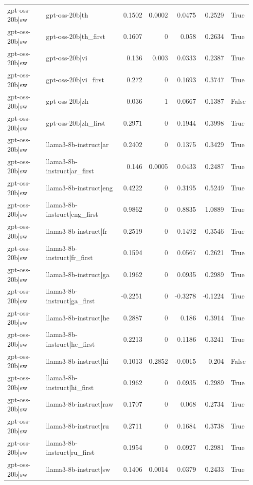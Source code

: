 \begin{table}
\begin{tabular}{l l r r r r l}
gpt-oss-20b|sw & gpt-oss-20b|th & 0.1502 & 0.0002 & 0.0475 & 0.2529 & True \\
gpt-oss-20b|sw & gpt-oss-20b|th_first & 0.1607 & 0 & 0.058 & 0.2634 & True \\
gpt-oss-20b|sw & gpt-oss-20b|vi & 0.136 & 0.003 & 0.0333 & 0.2387 & True \\
gpt-oss-20b|sw & gpt-oss-20b|vi_first & 0.272 & 0 & 0.1693 & 0.3747 & True \\
gpt-oss-20b|sw & gpt-oss-20b|zh & 0.036 & 1 & -0.0667 & 0.1387 & False \\
gpt-oss-20b|sw & gpt-oss-20b|zh_first & 0.2971 & 0 & 0.1944 & 0.3998 & True \\
gpt-oss-20b|sw & llama3-8b-instruct|ar & 0.2402 & 0 & 0.1375 & 0.3429 & True \\
gpt-oss-20b|sw & llama3-8b-instruct|ar_first & 0.146 & 0.0005 & 0.0433 & 0.2487 & True \\
gpt-oss-20b|sw & llama3-8b-instruct|eng & 0.4222 & 0 & 0.3195 & 0.5249 & True \\
gpt-oss-20b|sw & llama3-8b-instruct|eng_first & 0.9862 & 0 & 0.8835 & 1.0889 & True \\
gpt-oss-20b|sw & llama3-8b-instruct|fr & 0.2519 & 0 & 0.1492 & 0.3546 & True \\
gpt-oss-20b|sw & llama3-8b-instruct|fr_first & 0.1594 & 0 & 0.0567 & 0.2621 & True \\
gpt-oss-20b|sw & llama3-8b-instruct|ga & 0.1962 & 0 & 0.0935 & 0.2989 & True \\
gpt-oss-20b|sw & llama3-8b-instruct|ga_first & -0.2251 & 0 & -0.3278 & -0.1224 & True \\
gpt-oss-20b|sw & llama3-8b-instruct|he & 0.2887 & 0 & 0.186 & 0.3914 & True \\
gpt-oss-20b|sw & llama3-8b-instruct|he_first & 0.2213 & 0 & 0.1186 & 0.3241 & True \\
gpt-oss-20b|sw & llama3-8b-instruct|hi & 0.1013 & 0.2852 & -0.0015 & 0.204 & False \\
gpt-oss-20b|sw & llama3-8b-instruct|hi_first & 0.1962 & 0 & 0.0935 & 0.2989 & True \\
gpt-oss-20b|sw & llama3-8b-instruct|raw & 0.1707 & 0 & 0.068 & 0.2734 & True \\
gpt-oss-20b|sw & llama3-8b-instruct|ru & 0.2711 & 0 & 0.1684 & 0.3738 & True \\
gpt-oss-20b|sw & llama3-8b-instruct|ru_first & 0.1954 & 0 & 0.0927 & 0.2981 & True \\
gpt-oss-20b|sw & llama3-8b-instruct|sw & 0.1406 & 0.0014 & 0.0379 & 0.2433 & True \\

\end{tabular}
\end{table}
